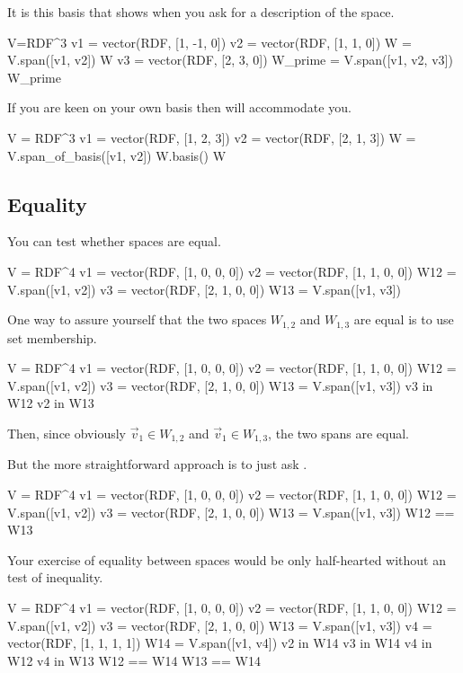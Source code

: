 It is this basis that \Sage{} shows when you ask for a description
of the space.
\begin{sageoutput}[d,0,3]
V=RDF^3               
v1 = vector(RDF, [1, -1, 0]) 
v2 = vector(RDF, [1, 1, 0]) 
W = V.span([v1, v2])       
W
v3 = vector(RDF, [2, 3, 0])
W_prime = V.span([v1, v2, v3])
W_prime
\end{sageoutput}

If you are keen on your own basis then \Sage{} will
accommodate you.
\begin{sageoutput}
V = RDF^3
v1 = vector(RDF, [1, 2, 3])
v2 = vector(RDF, [2, 1, 3])
W = V.span_of_basis([v1, v2])
W.basis()
W
\end{sageoutput}




\subsection{Equality}

You can test whether spaces are equal.
\begin{sageoutput}
V = RDF^4
v1 = vector(RDF, [1, 0, 0, 0])
v2 = vector(RDF, [1, 1, 0, 0])
W12 = V.span([v1, v2])
v3 = vector(RDF, [2, 1, 0, 0])
W13 = V.span([v1, v3])  
\end{sageoutput}
\noindent
One way to assure yourself that the two spaces $W_{1,2}$ and $W_{1,3}$ 
are equal is to use set membership.
\begin{sageoutput}[d,0,6]
V = RDF^4
v1 = vector(RDF, [1, 0, 0, 0])
v2 = vector(RDF, [1, 1, 0, 0])
W12 = V.span([v1, v2])
v3 = vector(RDF, [2, 1, 0, 0])
W13 = V.span([v1, v3])  
v3 in W12
v2 in W13
\end{sageoutput}
\noindent
Then, since obviously $\vec{v}_1\in W_{1,2}$ and $\vec{v}_1\in W_{1,3}$, the two
spans are equal.

But the more straightforward approach is to just ask \Sage{}.
\begin{sageoutput}[d,0,6]
V = RDF^4
v1 = vector(RDF, [1, 0, 0, 0])
v2 = vector(RDF, [1, 1, 0, 0])
W12 = V.span([v1, v2])
v3 = vector(RDF, [2, 1, 0, 0])
W13 = V.span([v1, v3])  
W12 == W13
\end{sageoutput}

Your exercise of \inlinecode{==} equality between spaces 
would be only half-hearted without an test of inequality. 
\begin{sageoutput}[d,0,6]
V = RDF^4
v1 = vector(RDF, [1, 0, 0, 0])
v2 = vector(RDF, [1, 1, 0, 0])
W12 = V.span([v1, v2])
v3 = vector(RDF, [2, 1, 0, 0])
W13 = V.span([v1, v3])  
v4 = vector(RDF, [1, 1, 1, 1])
W14 = V.span([v1, v4])
v2 in W14
v3 in W14                                 
v4 in W12
v4 in W13
W12 == W14                                                              
W13 == W14
\end{sageoutput}

